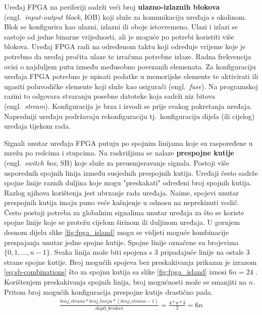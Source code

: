 \documentclass[times, utf8, diplomski]{fer}
\begin{document}
Uređaj FPGA na periferiji sadrži veći broj \textbf{ulazno-izlaznih blokova} (engl.~\textit{input-output block}, IOB) koji služe za komunikaciju uređaja s okolinom. Blok se konfigurira kao ulazni, izlazni ili oboje istovremeno. Ulazi i izlazi se sastoje od jedne binarne vrijednosti, ali je moguće po potrebi koristiti više blokova. Uređaj FPGA radi na određenom taktu koji određuje vrijeme koje je potrebno da uređaj pročita ulaze te izračuna potrebne izlaze. Radna frekvencija ovisi o najduljem putu između međusobno povezanih elemenata. Za konfiguraciju uređaja FPGA potrebno je upisati podatke u memorijske elemente te aktivirati ili ugasiti poluvodičke elemente koji služe kao osigurači (engl.~\textit{fuse}). Na programskoj razini to odgovara stvaranju posebne datoteke koja sadrži niz bitova (engl.~\textit{stream}). Konfiguracija je brza i izvodi se prije svakog pokretanja uređaja. Napredniji uređaju podržavaju rekonfiguraciju tj.~konfiguraciju dijela (ili cijelog) uređaja tijekom rada.

Signali unutar uređaja FPGA putuju po spojnim linijama koje su raspoređene u mrežu po redcima i stupcima. Na raskrižjima se nalaze \textbf{prespojne kutije} (engl.~\textit{switch box}, SB) koje služe za preusmjeravanje signala. Postoji više usporednih spojnih linija između susjednih prespojnih kutija. Uređaji često sadrže spojne linije raznih duljina koje mogu "preskakati" određeni broj spojnih kutija. Razlog njihova korištenja jest ubrzanje rada uređaja. Naime, spojevi unutar prespojnih kutija imaju puno veće kašnjenje u odnosu na neprekinuti vodič. Često postoji potreba za globalnim signalima unutar uređaja za što se koriste spojne linije koje se protežu cijelom širinom ili duljinom uređaja. U gornjem desnom dijelu slike \ref{fig:fpga_island} mogu se vidjeti moguće kombinacije prespajanja unutar jedne spojne kutije. Spojne linije označene su brojevima $\{0, 1, ..., n-1\}$. Svaka linija može biti spojena s $3$ pripadajuće linije na ostale $3$ strane spojne kutije. Broj mogućih spojeva bez preskakivanja prikazan je izrazom \ref{eq:sb-combinations} što za spojnu kutija sa slike \ref{fig:fpga_island} iznosi $6n = 24$ \cite{article:switch_box}. Korištenjem preskakivanja spojnih linija, broj mogućnosti može se smanjiti na $n$. Pritom broj mogućih konfiguracija prespojne kutije drastično pada.
%
\begin{gather}
	\label{eq:sb-combinations}
	\frac{broj\_strana * broj\_linija * (broj\_strana - 1)}{dupli\_bridovi} = \frac{4 * n * 3}{2} = 6n
\end{gather}
\end{document}
